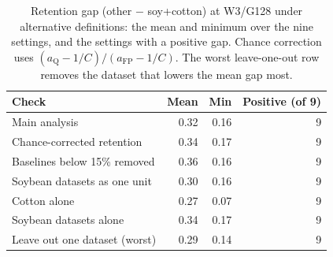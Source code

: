 \begin{table}[t]
\centering
\caption{Retention gap (other $-$ soy+cotton) at W3/G128 under alternative definitions: the mean and minimum over the nine settings, and the settings with a positive gap. Chance correction uses $(a_{\mathrm{Q}}-1/C)/(a_{\mathrm{FP}}-1/C)$. The worst leave-one-out row removes the dataset that lowers the mean gap most.}
\label{tab:robust}
\setlength{\tabcolsep}{3pt}
\small
\begin{tabular}{lrrr}
\toprule
Check & Mean & Min & Positive (of 9) \\
\midrule
Main analysis & 0.32 & 0.16 & 9 \\
Chance-corrected retention & 0.34 & 0.17 & 9 \\
Baselines below 15\% removed & 0.36 & 0.16 & 9 \\
Soybean datasets as one unit & 0.30 & 0.16 & 9 \\
Cotton alone & 0.27 & 0.07 & 9 \\
Soybean datasets alone & 0.34 & 0.17 & 9 \\
Leave out one dataset (worst) & 0.29 & 0.14 & 9 \\
\bottomrule
\end{tabular}
\end{table}
